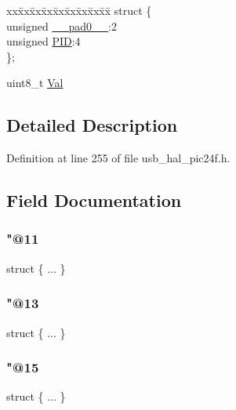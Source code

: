 \begin{DoxyCompactItemize}
\begin{tabbing}
\end{tabbing}\item 
\begin{tabbing}
xx\=xx\=xx\=xx\=xx\=xx\=xx\=xx\=xx\=\kill
struct \{\\
\>unsigned \mbox{\hyperlink{union___b_d___s_t_a_t_adf71f3d8410c1f1dbbc96680a92c49af}{\_\_pad0\_\_}}:2\\
\>unsigned \mbox{\hyperlink{union___b_d___s_t_a_t_a97b41b25e06fd7857dcc6217c160a8ad}{PID}}:4\\
\}; \\

\end{tabbing}\item 
uint8\+\_\+t \mbox{\hyperlink{union___b_d___s_t_a_t_aa0c179f4462bb12ca1ed40d18c89cda1}{Val}}
\end{DoxyCompactItemize}


\subsection{Detailed Description}


Definition at line 255 of file usb\+\_\+hal\+\_\+pic24f.\+h.



\subsection{Field Documentation}
\mbox{\label{union___b_d___s_t_a_t_aef5c890ba2a36d54f0507ff80291524a}} 
\subsubsection{\texorpdfstring{"@11}{@11}}
{\footnotesize\ttfamily struct \{ ... \} }

\mbox{\label{union___b_d___s_t_a_t_a4246cc01c82da684fad1cfc1a1a14507}} 
\subsubsection{\texorpdfstring{"@13}{@13}}
{\footnotesize\ttfamily struct \{ ... \} }

\mbox{\label{union___b_d___s_t_a_t_af117d1ef20daa4a4bffe19b6753cac13}} 
\subsubsection{\texorpdfstring{"@15}{@15}}
{\footnotesize\ttfamily struct \{ ... \} }

